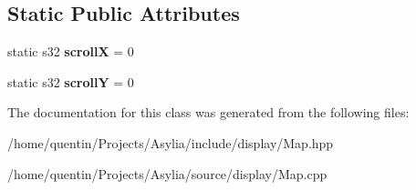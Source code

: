 \subsection*{Static Public Attributes}
\begin{DoxyCompactItemize}
\item 
\hypertarget{classMap_ac7681948af9e655b44605fcccc0217ed}{static s32 {\bfseries scroll\-X} = 0}\label{classMap_ac7681948af9e655b44605fcccc0217ed}

\item 
\hypertarget{classMap_a55e0dcce25c5008a4c80ff9f509d87d4}{static s32 {\bfseries scroll\-Y} = 0}\label{classMap_a55e0dcce25c5008a4c80ff9f509d87d4}

\end{DoxyCompactItemize}


The documentation for this class was generated from the following files\-:\begin{DoxyCompactItemize}
\item 
/home/quentin/\-Projects/\-Asylia/include/display/Map.\-hpp\item 
/home/quentin/\-Projects/\-Asylia/source/display/Map.\-cpp\end{DoxyCompactItemize}
